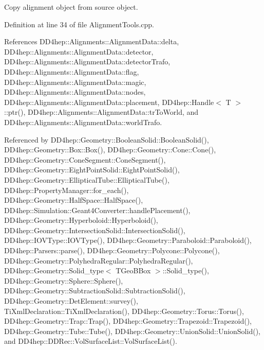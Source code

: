 Copy alignment object from source object. 



Definition at line 34 of file Alignment\+Tools.\+cpp.



References D\+D4hep\+::\+Alignments\+::\+Alignment\+Data\+::delta, D\+D4hep\+::\+Alignments\+::\+Alignment\+Data\+::detector, D\+D4hep\+::\+Alignments\+::\+Alignment\+Data\+::detector\+Trafo, D\+D4hep\+::\+Alignments\+::\+Alignment\+Data\+::flag, D\+D4hep\+::\+Alignments\+::\+Alignment\+Data\+::magic, D\+D4hep\+::\+Alignments\+::\+Alignment\+Data\+::nodes, D\+D4hep\+::\+Alignments\+::\+Alignment\+Data\+::placement, D\+D4hep\+::\+Handle$<$ T $>$\+::ptr(), D\+D4hep\+::\+Alignments\+::\+Alignment\+Data\+::tr\+To\+World, and D\+D4hep\+::\+Alignments\+::\+Alignment\+Data\+::world\+Trafo.



Referenced by D\+D4hep\+::\+Geometry\+::\+Boolean\+Solid\+::\+Boolean\+Solid(), D\+D4hep\+::\+Geometry\+::\+Box\+::\+Box(), D\+D4hep\+::\+Geometry\+::\+Cone\+::\+Cone(), D\+D4hep\+::\+Geometry\+::\+Cone\+Segment\+::\+Cone\+Segment(), D\+D4hep\+::\+Geometry\+::\+Eight\+Point\+Solid\+::\+Eight\+Point\+Solid(), D\+D4hep\+::\+Geometry\+::\+Elliptical\+Tube\+::\+Elliptical\+Tube(), D\+D4hep\+::\+Property\+Manager\+::for\+\_\+each(), D\+D4hep\+::\+Geometry\+::\+Half\+Space\+::\+Half\+Space(), D\+D4hep\+::\+Simulation\+::\+Geant4\+Converter\+::handle\+Placement(), D\+D4hep\+::\+Geometry\+::\+Hyperboloid\+::\+Hyperboloid(), D\+D4hep\+::\+Geometry\+::\+Intersection\+Solid\+::\+Intersection\+Solid(), D\+D4hep\+::\+I\+O\+V\+Type\+::\+I\+O\+V\+Type(), D\+D4hep\+::\+Geometry\+::\+Paraboloid\+::\+Paraboloid(), D\+D4hep\+::\+Parsers\+::parse(), D\+D4hep\+::\+Geometry\+::\+Polycone\+::\+Polycone(), D\+D4hep\+::\+Geometry\+::\+Polyhedra\+Regular\+::\+Polyhedra\+Regular(), D\+D4hep\+::\+Geometry\+::\+Solid\+\_\+type$<$ T\+Geo\+B\+Box $>$\+::\+Solid\+\_\+type(), D\+D4hep\+::\+Geometry\+::\+Sphere\+::\+Sphere(), D\+D4hep\+::\+Geometry\+::\+Subtraction\+Solid\+::\+Subtraction\+Solid(), D\+D4hep\+::\+Geometry\+::\+Det\+Element\+::survey(), Ti\+Xml\+Declaration\+::\+Ti\+Xml\+Declaration(), D\+D4hep\+::\+Geometry\+::\+Torus\+::\+Torus(), D\+D4hep\+::\+Geometry\+::\+Trap\+::\+Trap(), D\+D4hep\+::\+Geometry\+::\+Trapezoid\+::\+Trapezoid(), D\+D4hep\+::\+Geometry\+::\+Tube\+::\+Tube(), D\+D4hep\+::\+Geometry\+::\+Union\+Solid\+::\+Union\+Solid(), and D\+D4hep\+::\+D\+D\+Rec\+::\+Vol\+Surface\+List\+::\+Vol\+Surface\+List().

